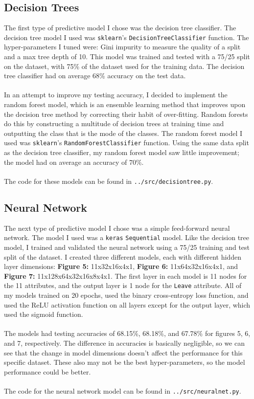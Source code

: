 \documentclass[12pt, notitlepage]{article}
\begin{document}
\subsection{Decision Trees}
The first type of predictive model I chose was the decision tree classifier. The decision tree model I used was \texttt{sklearn}'s \texttt{DecisionTreeClassifier} function. The hyper-parameters I tuned were: Gini impurity to measure the quality of a split and a max tree depth of 10. This model was trained and tested with a 75/25 split on the dataset, with 75\% of the dataset used for the training data. The decision tree classifier had on average 68\% accuracy on the test data.\\\\
In an attempt to improve my testing accuracy, I decided to implement the random forest model, which is an ensemble learning method that improves upon the decision tree method by correcting their habit of over-fitting. Random forests do this by constructing a multitude of decision trees at training time and outputting the class that is the mode of the classes. The random forest model I used was \texttt{sklearn}'s \texttt{RandomForestClassifier} function. Using the same data split as the decision tree classifier, my random forest model saw little improvement; the model had on average an accuracy of 70\%. \\\\
The code for these models can be found in \texttt{../src/decisiontree.py}.
\subsection{Neural Network}
The next type of predictive model I chose was a simple feed-forward neural network. The model I used was a \texttt{keras} \texttt{Sequential} model. Like the decision tree model, I trained and validated the neural network using a 75/25 training and test split of the dataset. I created three different models, each with different hidden layer dimensions: \textbf{Figure 5:} 11x32x16x4x1, \textbf{Figure 6:} 11x64x32x16x4x1, and \textbf{Figure 7:} 11x128x64x32x16x8x4x1. The first layer in each model is 11 nodes for the 11 attributes, and the output layer is 1 node for the \texttt{Leave} attribute. All of my models trained on 20 epochs, used the binary cross-entropy loss function, and used the ReLU activation function on all layers except for the output layer, which used the sigmoid function.  \\\\
The models had testing accuracies of 68.15\%, 68.18\%, and 67.78\% for figures 5, 6, and 7, respectively. The difference in accuracies is basically negligible, so we can see that the change in model dimensions doesn't affect the performance for this specific dataset. These also may not be the best hyper-parameters, so the model performance could be better. \\\\
The code for the neural network model can be found in \texttt{../src/neuralnet.py}.
\end{document}

